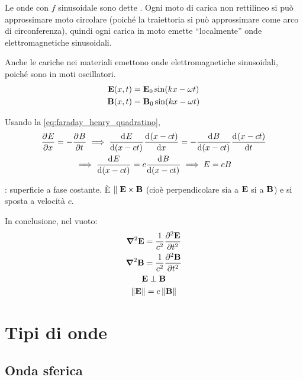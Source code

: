 Le onde con $f$ sinusoidale sono dette .
Ogni moto di carica non rettilineo si può approssimare moto circolare (poiché la traiettoria si può approssimare come arco di circonferenza), quindi ogni carica in moto emette ``localmente'' onde elettromagnetiche sinusoidali.

Anche le cariche nei materiali emettono onde elettromagnetiche sinusoidali, poiché sono in moti oscillatori.
\begin{subequations}
\begin{gather}
    \mathbf{E}(x, t) = \mathbf{E}_0 \sin(k x - \omega t) \\
    \mathbf{B}(x, t) = \mathbf{B}_0 \sin(k x - \omega t)
\end{gather}
\end{subequations}

Usando la \eqref{eq:faraday_henry_quadratino},
\begin{equation}
\begin{gathered}
    \parder[E]{x} = - \parder[B]{t}
    \implies
    \der[E]{(x - c t)} \der[(x - c t)]{x} = - \der[B]{(x - c t)} \der[(x - c t)]{t} \\
    \implies
    \der[E]{(x - c t)} = c \der[B]{(x - c t)}
    \implies
    E = c B
\end{gathered}
\end{equation}

: superficie a fase costante.
È $\parallel \mathbf{E} \times \mathbf{B}$ (cioè perpendicolare sia a $\mathbf{E}$ si a $\mathbf{B}$) e si sposta a velocità $c$.

In conclusione, nel vuoto:
\begin{subequations}
\begin{gather}
    \vlapl \E = \frac{1}{c^2} \parder[\E][2]{t} \\
    \vlapl \B = \frac{1}{c^2} \parder[\B][2]{t} \\
    \E \perp \B \\
    \norm{\E} = c\norm{\B}
\end{gather}
\end{subequations}


\section{Tipi di onde}

\subsection{Onda sferica}

